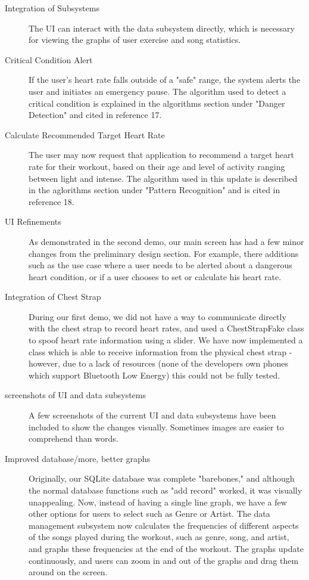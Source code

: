 \documentclass[letterpaper,english, 12pt]{scrreprt}
\begin{document}
\begin{description}
	\item[Integration of Subsystems] The UI can interact with the data subsystem directly, which is necessary for viewing the graphs of user exercise and song statistics.
	\item[Critical Condition Alert] If the user's heart rate falls outside of a "safe" range, the system alerts the user and initiates an emergency pause. The algorithm used to detect a critical condition is explained in the algorithms section under "Danger Detection" and cited in reference 17.
	\item[Calculate Recommended Target Heart Rate] The user may now request that application to recommend a target heart rate for their workout, based on their age and level of activity ranging between light and intense. The algorithm used in this update is described in the aglorithms section under "Pattern Recognition" and is cited in reference 18.
	\item[UI Refinements]  As demonstrated in the second demo, our main screen has had a few minor changes from the preliminary design section. For example, there additions such as the use case where a user needs to be alerted about a dangerous heart condition, or if a user chooses to set or calculate his heart rate.
	\item[Integration of Chest Strap] During our first demo, we did not have a way to communicate directly with the chest strap to record heart rates, and used a ChestStrapFake class to spoof heart rate information using a slider. We have now implemented a class which is able to receive information from the physical chest strap - however, due to a lack of resources (none of the developers own phones which support Bluetooth Low Energy) this could not be fully tested.
	\item[screenshots of UI and data subsystems] A few screenshots of the current UI and data subsystems have been included to show the changes visually. Sometimes images are easier to comprehend than words.
	\item[Improved database/more, better graphs] Originally, our SQLite database was complete "barebones," and although the normal database functions such as "add record" worked, it was visually unappealing. Now, instead of having a single line graph, we have a few other options for users to select such as Genre or Artist. The data management subsystem now calculates the frequencies of different aspects of the songs played during the workout, such as genre, song, and artist, and graphs these frequencies at the end of the workout. The graphs update continuously, and users can zoom in and out of the graphs and drag them around on the screen.

\end{description}
\end{document}
